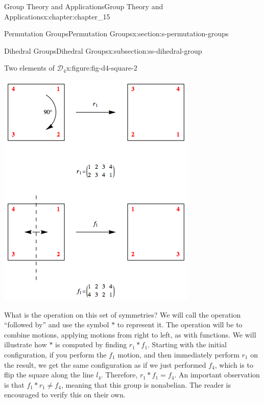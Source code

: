\documentclass[oneside,10pt,]{book}
\numberwithin{equation}{section}
\begin{document}
\begin{chapterptx}{Group Theory and Applications}{}{Group Theory and Applications}{}{}{x:chapter:chapter_15}
\begin{sectionptx}{Permutation Groups}{}{Permutation Groups}{}{}{x:section:s-permutation-groups}
\begin{subsectionptx}{Dihedral Groups}{}{Dihedral Groups}{}{}{x:subsection:ss-dihedral-group}
\begin{figureptx}{Two elements of \(\mathcal{D}_4\)}{x:figure:fig-d4-square-2}{}
\begin{image}{0.15}{0.7}{0.15}
\includegraphics[width=\linewidth]{images/fig-d4-square-2.png}
\end{image}%
\tcblower
\end{figureptx}%
What is the operation on this set of symmetries?   We will call the operation ``followed by'' and use the symbol \(*\)  to represent it.  The operation will be to combine motions, applying motions from right to left, as with functions.  We will illustrate how \(*\) is computed by finding  \(r_1*f_1\).  Starting with the initial configuration, if you perform the \(f_1\) motion, and then immediately perform \(r_1\) on the result, we get the same configuration as if we just performed \(f_4\), which is to flip the square along the line \(l_4\).   Therefore, \(r_1*f_1 = f_4\).  An important observation is that \(f_1*r_1 \neq f_4\), meaning that this group is nonabelian. The reader is encouraged to verify this on their own.%
\par

\end{subsectionptx}
\end{sectionptx}
\end{chapterptx}
\end{document}
